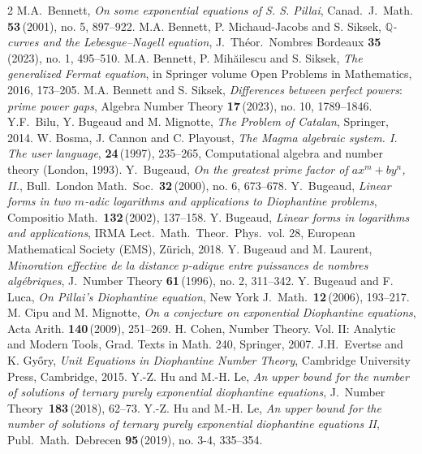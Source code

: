 \documentclass[11pt]{amsart}
\numberwithin{equation}{section}
\begin{document}
\begin{thebibliography}{2}
%
M.A.~Bennett,
{\it On some exponential equations of S. S. Pillai},
Canad.\ J.\ Math. {\bf 53}\,(2001), no. 5, 897--922.
%
M.A. Bennett, P. Michaud-Jacobs and S. Siksek,
{\it $\mathbb Q$-curves and the Lebesgue–Nagell equation},
J.\ Th\'eor.\ Nombres Bordeaux {\bf 35}\,(2023), no. 1, 495--510.
%
M.A. Bennett, P. Mih\u{a}ilescu and S. Siksek,
{\it The generalized Fermat equation}, in Springer volume Open Problems in Mathematics, 2016, 173--205.
%
M.A. Bennett and S. Siksek,
{\it Differences between perfect powers$:$ prime power gaps}, Algebra Number Theory {\bf 17}\,(2023), no. 10, 1789--1846.
%
Y.F.~Bilu, Y. Bugeaud and M. Mignotte,
{\it The Problem of Catalan}, Springer, 2014.
%
W. Bosma, J. Cannon and C. Playoust,
{\it The Magma algebraic system. I. The user language}, 
{\bf 24}\,(1997), 235--265, Computational algebra and number theory (London, 1993).
%
Y.~Bugeaud,
{\it On the greatest prime factor of $ax^m+by^n$, II.},
Bull.\ London Math.\ Soc.\ {\bf 32}\,(2000), no. 6, 673--678.
%
Y.~Bugeaud,
{\it Linear forms in two $m$-adic logarithms and applications to Diophantine problems},
Compositio Math.\ {\bf 132}\,(2002), 137--158.
%
Y. Bugeaud,
{\it Linear forms in logarithms and applications},
IRMA Lect.\ Math.\ Theor.\ Phys.\ vol. 28, European Mathematical Society (EMS), Z\"urich, 2018.
%
Y. Bugeaud and M. Laurent,
{\it Minoration effective de la distance $p$-adique entre puissances de nombres alg\'ebriques},
J.\ Number Theory {\bf 61}\,(1996), no. 2, 311--342.
%
Y. Bugeaud and F. Luca,
{\it On Pillai's Diophantine equation},
New York J.\ Math.\ {\bf 12}\,(2006), 193--217.
%
M. Cipu and M. Mignotte,
{\it On a conjecture on exponential Diophantine equations},
Acta Arith. {\bf 140}\,(2009), 251--269.
%
H. Cohen,
Number Theory. Vol. II: Analytic and Modern Tools, Grad. Texts in Math. 240, Springer, 2007.
%
J.H.~Evertse and K. Gy{\H o}ry,
{\it Unit Equations in Diophantine Number Theory},
Cambridge University Press, Cambridge, 2015.
%
Y.-Z. Hu and M.-H. Le,
{\it An upper bound for the number of solutions of ternary purely exponential diophantine equations},
J.\ Number Theory \,{\bf 183}\,(2018), 62--73.
%
Y.-Z. Hu and M.-H. Le,
{\it An upper bound for the number of solutions of ternary purely exponential diophantine equations II},
Publ.\ Math.\ Debrecen {\bf 95}\,(2019), no. 3-4, 335--354.

\end{thebibliography}
\end{document}
